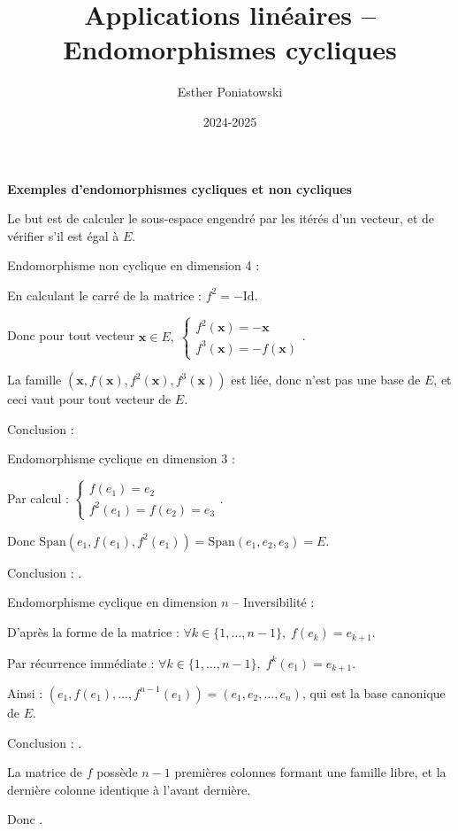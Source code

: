 \documentclass[10pt,a4paper]{article}
\title{Applications linéaires -- Endomorphismes cycliques}
\author{Esther Poniatowski}
\date{2024-2025}
\begin{document}
\textbf{Exemples d'endomorphismes cycliques et non cycliques}

Le but est de calculer le sous-espace engendré par les itérés d'un vecteur, et de vérifier s'il est
égal à \(E\).

\q Endomorphisme non cyclique en dimension 4 :

En calculant le carré de la matrice : \(f^2 = -\mathrm{Id}\).

Donc pour tout vecteur \(\mathbf{x} \in E,\; \begin{cases} f^2(\mathbf{x}) = -\mathbf{x}\\
f^3(\mathbf{x}) = -f(\mathbf{x})\end{cases}\).

La famille \((\mathbf{x}, f(\mathbf{x}),f^2(\mathbf{x}), f^3(\mathbf{x}))\) est liée, donc n'est pas
une base de \(E\), et ceci vaut pour tout vecteur de \(E\).

Conclusion : 

\q Endomorphisme cyclique en dimension 3 :

Par calcul : \(\begin{cases} f(e_1) = e_2\\
f^2(e_1) = f(e_2) = e_3\end{cases}\).

Donc \(\mathrm{Span}(e_1, f(e_1),f^2(e_1)) = \mathrm{Span}(e_1,e_2,e_3)=E\).

Conclusion : .

\q Endomorphisme cyclique en dimension \(n\) -- Inversibilité :

D'après la forme de la matrice : \(\forall k \in \{ 1,\dots,n-1 \},\; f(e_k) = e_{k+1}\).

Par récurrence immédiate : \(\forall k \in \{ 1,\dots,n-1 \},\; f^k(e_1) = e_{k+1}\).

Ainsi : \((e_1, f(e_1), ..., f^{n-1}(e_1)) = (e_1, e_2, ..., e_n)\), qui est la base canonique de
\(E\).

Conclusion : .

La matrice de \(f\) possède \(n-1\) premières colonnes formant une famille libre, et la dernière
colonne identique à l'avant dernière.

Donc .
\end{document}
